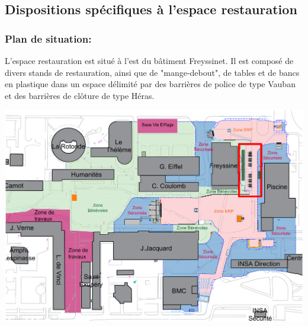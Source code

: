 \documentclass[hidelinks, paper=a4, fontsize=13pt]{report}
\begin{document}
\subsection{Dispositions spécifiques à l’espace restauration}

\subsubsection{Plan de situation:}
L’espace restauration est situé à l'est du bâtiment Freyssinet. Il est composé de divers stands de restauration, ainsi que de "mange-debout", de tables et de bancs en plastique dans un espace délimité par des barrières  de police de type Vauban et des barrières de clôture de type Héras.

\begin{center}
	\includegraphics[width=.8\textwidth,keepaspectratio]{Exports/Plan_24h_45eme-Espace_Resto}

\end{center}
\end{document}
